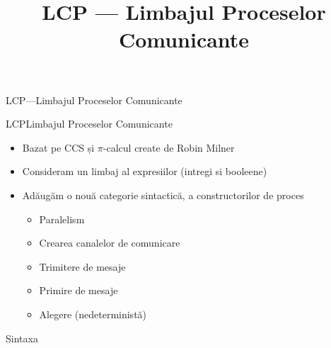 \documentclass[xcolor=pdftex,romanian,colorlinks]{beamer}
\title[PD---LCP]{LCP --- Limbajul Proceselor Comunicante}
\begin{document}
\maketitle


\begin{section}{LCP—Limbajul Proceselor Comunicante}

\begin{frame}{LCP}{Limbajul Proceselor Comunicante}
\begin{itemize}
\item Bazat pe CCS și $\pi$-calcul create de Robin Milner
\item Consideram un limbaj al expresiilor (intregi si booleene)
\item Adăugăm o nouă categorie sintactică, a constructorilor de proces 
\begin{itemize}
\item Paralelism  
\item Crearea canalelor de comunicare 
\item Trimitere de mesaje 
\item Primire de mesaje
\item Alegere (nedeterministă)
\end{itemize}
\end{itemize}
\end{frame}

\begin{frame}{Sintaxa}
\vspace{-5ex}
\end{frame}
\end{section}
\end{document}
